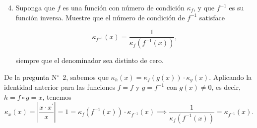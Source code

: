 \documentclass[
	spanish,
	8pt,
	utf8,
	xcolor=table,
	handout,
	aspectratio=169,
	professionalfonts,
	mathserif,
	leqno,
]{beamer}
\begin{document}
\begin{frame}

	\begin{enumerate}\setcounter{enumi}{3}
		\item

		      Suponga que $f$ es una función con número de condición
		      $\kappa_{f}$, y que $f^{-1}$ es su función inversa.
		      Muestre que el número de condición de $f^{-1}$ satisface

		      \begin{equation*}
			      \boxed{
				      \kappa_{f^{-1}}\left(x\right)=
				      \frac{1}{\kappa_{f}\left(f^{-1}\left(x\right)\right)},
			      }
		      \end{equation*}

		      siempre que el denominador sea distinto de cero.

	\end{enumerate}

	\begin{solution}
		De la pregunta N$^{\circ}$~2, sabemos que
		\begin{math}
			\kappa_{h}\left(x\right)=
			\kappa_{f}\left(g\left(x\right)\right)\cdot
			\kappa_{g}\left(x\right)
		\end{math}.
		Aplicando la identidad anterior para las funciones $f=f$ y
		$g=f^{-1}$ con $g\left(x\right)\neq0$, es decir, $h=f\circ g=x$,
		tenemos
		\begin{equation*}
			\kappa_{x}\left(x\right)=
			\left|\frac{x\cdot x^{\prime}}{x}\right|=
			1=
			\kappa_{f}\left(f^{-1}\left(x\right)\right)\cdot
			\kappa_{f^{-1}}\left(x\right)\implies
			\frac{1}{\kappa_{f}\left(f^{-1}\left(x\right)\right)}=
			\kappa_{f^{-1}}\left(x\right).
		\end{equation*}
	\end{solution}
\end{frame}
\end{document}
